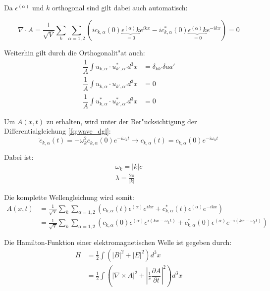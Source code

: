 Da $\epsilon^{(\alpha)}$ und $k$ orthogonal sind gilt dabei auch automatisch:

\begin{equation}
\nabla \cdot A = \frac{1}{\sqrt{V}} \sum_k \sum_{\alpha=1,2} (i c_{k,\alpha}(0) \underbrace{\epsilon^{(\alpha)} k}_{=0} e^{ikx} - i c^*_{k,\alpha}(0) \underbrace{\epsilon^{(\alpha)} k}_{=0} e^{-ikx}) = 0
\end{equation}

Weiterhin gilt durch die Orthogonalit"at auch:
\begin{equation}
\begin{split}
\dfrac{1}{A} \int u_{k,\alpha} \cdot u^*_{k',\alpha'} d^3 x &= \delta_{kk'}\delta{aa'} \\
\dfrac{1}{A} \int u_{k,\alpha} \cdot u_{k',\alpha'} d^3 x &= 0 \\
\dfrac{1}{A} \int u^*_{k,\alpha} \cdot u^*_{k',\alpha'} d^3 x &= 0
\end{split}
\end{equation}

Um $A(x,t)$ zu erhalten, wird unter der Ber"ucksichtigung der Differentialgleichung \ref{fq:wave_dgl}:
\begin{equation}
\ddot{c}_{k,\alpha}(t) = -\omega_k^2 c_{k,\alpha}(0) e^{-i \omega_k t} \rightarrow c_{k,\alpha}(t) = c_{k,\alpha}(0) e^{-i \omega_k t}
\end{equation}

Dabei ist:
\begin{equation}
\begin{split}
\omega_k=|k|c \\
\lambda = \frac{2 \pi}{|k|}
\end{split}
\end{equation}

Die komplette Wellengleichung wird somit:
\begin{equation} \label{fq:wave_eq}
\begin{split}
A(x,t) &= \frac{1}{\sqrt{V}} \sum_k \sum_{\alpha=1,2} (c_{k,\alpha}(t) \epsilon^{(\alpha)} e^{ikx} + c^*_{k,\alpha}(t) \epsilon^{(\alpha)} e^{-ikx}) \\
&= \frac{1}{\sqrt{V}} \sum_k \sum_{\alpha=1,2} (c_{k,\alpha}(0) \epsilon^{(\alpha)} e^{i (kx - \omega_k t)} + c^*_{k,\alpha}(0) \epsilon^{(\alpha)} e^{-i(kx - \omega_k t)})
\end{split}
\end{equation}

Die Hamilton-Funktion einer elektromagnetischen Welle ist gegeben durch:
\begin{equation}
\begin{split}
H &= \frac{1}{2} \int (|B|^2 + |E|^2) d^3 x \\
	&= \frac{1}{2} \int \left(| \nabla\times A |^2 + \left| \frac{1}{c} \dfrac{\partial A}{\partial t} \right|^2 \right) d^3 x 
\end{split}
\end{equation}

